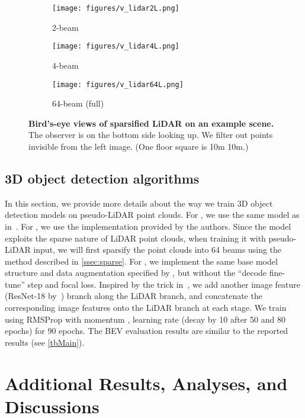 \begin{figure*}[!htb]
	\centering
	\begin{subfigure}[b]{0.29\textwidth}
	    \texttt{[image: figures/v\_lidar2L.png]}
	    \caption{2-beam}
	\end{subfigure}
	\begin{subfigure}[b]{0.29\textwidth}
	    \texttt{[image: figures/v\_lidar4L.png]}
	    \caption{4-beam}
	\end{subfigure}
	\begin{subfigure}[b]{0.29\textwidth}
	    \texttt{[image: figures/v\_lidar64L.png]}
	    \caption{64-beam (full)}
	\end{subfigure}
	\caption{\textbf{Bird's-eye views of sparsified LiDAR on an example scene.} The observer is on the bottom side looking up. We filter out points invisible from the left image. (One floor square is 10m  10m.) \label{fig::bevsparsed}}
\end{figure*}

\subsection{3D object detection algorithms}
\label{ssec:3D}
In this section, we provide more details about the way we train 3D object detection models on pseudo-LiDAR point clouds.
For \AVOD, we use the same model as in~\citep{pseudoLiDAR}.
For \PRCNN, we use the implementation provided by the authors. Since the \PRCNN model exploits the sparse nature of LiDAR point clouds, when training it with pseudo-LiDAR input, we will first sparsify the point clouds into 64 beams using the method described in \autoref{ssec:sparse}.
For \vPIXOR, we implement the same base model structure and data augmentation specified by \cite{yang2018pixor}, but without the ``decode fine-tune'' step and focal loss. Inspired by the trick in~\citep{liang2018deep}, we add another image feature (ResNet-18 by~\cite{he2016deep}) branch along the LiDAR branch, and concatenate the corresponding image features onto the LiDAR branch at each stage. We train \vPIXOR using RMSProp with momentum , learning rate  (decay by 10 after 50 and 80 epochs) for 90 epochs. The BEV evaluation results are similar to the reported results (see \autoref{tbMain}).

\section{Additional Results, Analyses, and Discussions}
\label{ssec:AR}

